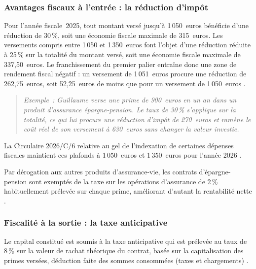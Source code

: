﻿\documentclass[12pt, a4paper]{article}
\begin{document}
\subsubsection*{Avantages fiscaux à l'entrée : la réduction
d'impôt}
\label{sub:avantages_ep}

Pour l'année fiscale~2025, tout montant versé
jusqu'à 1\,050~euros bénéficie d'une réduction de 30\,\%,
soit une économie fiscale maximale de 315~euros. Les
versements compris entre 1\,050 et 1\,350~euros font l'objet
d'une réduction réduite à 25\,\% sur la totalité du
montant versé, soit une économie fiscale maximale de
337,50~euros. Le franchissement du premier palier entraîne
donc une zone de rendement fiscal négatif : un versement de
1\,051~euros procure une réduction de 262,75~euros, soit
52,25~euros de moins que pour un versement de 1\,050~euros \cite[art.~145\textsuperscript{1}, 145\textsuperscript{2} et 145\textsuperscript{8}]{cir92_2025}.

\newpage

\begin{quote}
\textit{Exemple~: Guillaume verse une prime de 900~euros en un an dans un produit d'assurance épargne-pension. Le taux de 30\,\% s'applique
sur la totalité, ce qui lui procure une réduction d'impôt de 270~euros et ramène le
coût réel de son versement à 630~euros sans changer la valeur investie.}
\end{quote}

La Circulaire 2026/C/6 relative au gel de l'indexation de certaines
dépenses fiscales maintient ces plafonds à 1\,050~euros et 1\,350~euros
pour l'année 2026 \cite{cir92_circ2026}. 

Par dérogation aux autres produits d'assurance-vie, les
contrats d'épargne-pension sont exemptés de la taxe sur les
opérations d'assurance de 2\,\%  habituellement prélevée sur
chaque prime, améliorant d'autant la rentabilité nette \cite[art.~175\textsuperscript{3} et 176\textsuperscript{2}]{cdtd1927}.

\subsubsection*{Fiscalité à la sortie : la taxe anticipative}
\label{subsub:taxe_anticipative_ep}

Le capital constitué est soumis à la taxe
anticipative qui est prélevée au taux de 8\,\% sur la valeur de rachat
théorique du contrat, basée sur
la capitalisation des primes versées, déduction faite des sommes
consommées (taxes et chargements) \cite[art.~184 à 186]{cdtd1927}. 
\end{document}
